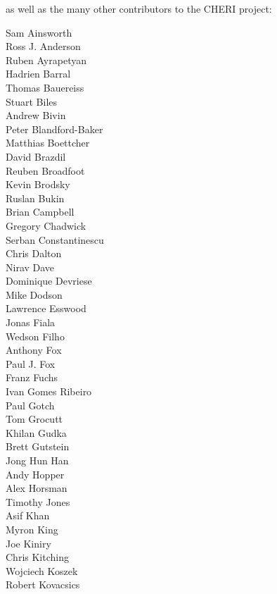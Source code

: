 \medskip
\noindent
as well as the many other contributors to the CHERI project:
\medskip

\begin{small}
\noindent\begin{autogrid}{4}
Sam Ainsworth \\
Ross J. Anderson \\
Ruben Ayrapetyan \\
Hadrien Barral \\
Thomas Bauereiss \\
Stuart Biles \\
Andrew Bivin \\
Peter Blandford-Baker \\
Matthias Boettcher \\
David Brazdil \\
Reuben Broadfoot \\
Kevin Brodsky \\
Ruslan Bukin \\
Brian Campbell \\
Gregory Chadwick \\
Serban Constantinescu \\
Chris Dalton \\
Nirav Dave \\
Dominique Devriese \\
Mike Dodson \\
Lawrence Esswood \\
Jonas Fiala \\
Wedson Filho \\
Anthony Fox \\
Paul J. Fox \\
Franz Fuchs \\
Ivan Gomes Ribeiro \\
Paul Gotch \\
Tom Grocutt \\
Khilan Gudka \\
Brett Gutstein \\
Jong Hun Han \\
Andy Hopper \\
Alex Horsman \\
Timothy Jones \\
Asif Khan \\
Myron King \\
Joe Kiniry \\
Chris Kitching \\
Wojciech Koszek \\
Robert Kovacsics \\

\end{autogrid}
\end{small}
